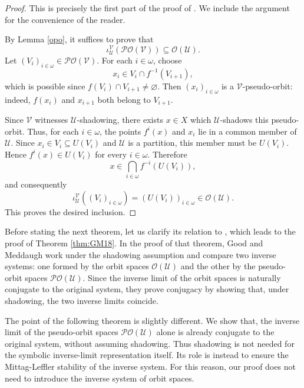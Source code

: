 \documentclass[10pt,a4paper]{amsart}
\numberwithin{equation}{section}
\begin{document}
\begin{proof}
This is precisely the first part of the proof of \cite[Lemma 15]{GM}. We
include the argument for the convenience of the reader.

By Lemma \ref{opo}, it suffices to prove that
\[
    \iota_{\mathcal U}^{\mathcal V}(\mathcal{PO}(\mathcal V))
    \subseteq \mathcal O(\mathcal U).
\]
Let $(V_i)_{i\in\omega}\in\mathcal{PO}(\mathcal V)$. For each $i\in\omega$,
choose
\[
    x_i\in V_i\cap f^{-1}(V_{i+1}),
\]
which is possible since $f(V_i)\cap V_{i+1}\neq\varnothing$. Then
$(x_i)_{i\in\omega}$ is a $\mathcal V$-pseudo-orbit: indeed,
$f(x_i)$ and $x_{i+1}$ both belong to $V_{i+1}$.

Since $\mathcal V$ witnesses $\mathcal U$-shadowing, there exists $x\in X$
which $\mathcal U$-shadows this pseudo-orbit. Thus, for each $i\in\omega$,
the points $f^i(x)$ and $x_i$ lie in a common member of $\mathcal U$. Since
$x_i\in V_i\subseteq U(V_i)$ and $\mathcal U$ is a partition, this member must
be $U(V_i)$. Hence $f^i(x)\in U(V_i)$ for every $i\in\omega$. Therefore
\[
    x\in \bigcap_{i\in\omega} f^{-i}(U(V_i)),
\]
and consequently
\[
    \iota_{\mathcal U}^{\mathcal V}((V_i)_{i\in\omega})
    =
    (U(V_i))_{i\in\omega}
    \in \mathcal O(\mathcal U).
\]
This proves the desired inclusion.
\end{proof}





Before stating the next theorem, let us clarify its relation to
\cite[Theorem 16]{GM}, which leads to the proof of Theorem \ref{thm:GM18}. In the proof of that theorem, Good and Meddaugh work
under the shadowing assumption and compare two inverse systems: one formed by
the orbit spaces $\mathcal O(\mathcal U)$ and the other by the pseudo-orbit
spaces $\mathcal{PO}(\mathcal U)$. Since the inverse limit of the orbit spaces
is naturally conjugate to the original system, they prove conjugacy by showing
that, under shadowing, the two inverse limits coincide.

The point of the following theorem is slightly different. We show that, the inverse limit of the pseudo-orbit spaces
$\mathcal{PO}(\mathcal U)$ alone is already conjugate to the original system,
without assuming shadowing. Thus shadowing is not needed for the symbolic
inverse-limit representation itself. Its role is instead to ensure the
Mittag-Leffler stability of the inverse system. For this reason, our proof does
not need to introduce the inverse system of orbit spaces.
\end{document}

